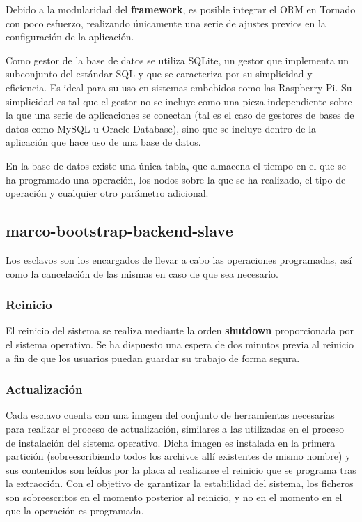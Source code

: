 \documentclass{article}
\begin{document}
Debido a la modularidad del \textbf{framework}, es posible integrar el ORM en Tornado con poco esfuerzo, realizando únicamente una serie de ajustes previos en la configuración de la aplicación.

Como gestor de la base de datos se utiliza SQLite, un gestor que implementa un subconjunto del estándar SQL y que se caracteriza por su simplicidad y eficiencia. Es ideal para su uso en sistemas embebidos como las Raspberry Pi. Su simplicidad es tal que el gestor no se incluye como una pieza independiente sobre la que una serie de aplicaciones se conectan (tal es el caso de gestores de bases de datos como MySQL u Oracle Database), sino que se incluye dentro de la aplicación que hace uso de una base de datos.

En la base de datos existe una única tabla, que almacena el tiempo en el que se ha programado una operación, los nodos sobre la que se ha realizado, el tipo de operación y cualquier otro parámetro adicional.

\subsection{marco-bootstrap-backend-slave}

Los esclavos son los encargados de llevar a cabo las operaciones programadas, así como la cancelación de las mismas en caso de que sea necesario.

\subsubsection{Reinicio}

El reinicio del sistema se realiza mediante la orden \textbf{shutdown} proporcionada por el sistema operativo. Se ha dispuesto una espera de dos minutos previa al reinicio a fin de que los usuarios puedan guardar su trabajo de forma segura.

\subsubsection{Actualización}

Cada esclavo cuenta con una imagen del conjunto de herramientas necesarias para realizar el proceso de actualización, similares a las utilizadas en el proceso de instalación del sistema operativo. Dicha imagen es instalada en la primera partición (sobreescribiendo todos los archivos allí existentes de mismo nombre) y sus contenidos son leídos por la placa al realizarse el reinicio que se programa tras la extracción. Con el objetivo de garantizar la estabilidad del sistema, los ficheros son sobreescritos en el momento posterior al reinicio, y no en el momento en el que la operación es programada.
\end{document}
